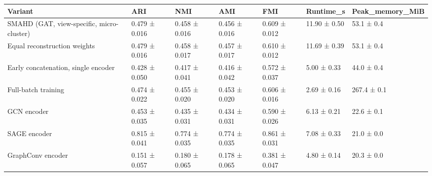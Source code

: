 \begin{tabular}{lllllll}
\toprule
Variant & ARI & NMI & AMI & FMI & Runtime\_s & Peak\_memory\_MiB \\
\midrule
SMAHD (GAT, view-specific, micro-cluster) & 0.479 ± 0.016 & 0.458 ± 0.016 & 0.456 ± 0.016 & 0.609 ± 0.012 & 11.90 ± 0.50 & 53.1 ± 0.4 \\
Equal reconstruction weights & 0.479 ± 0.016 & 0.458 ± 0.017 & 0.457 ± 0.017 & 0.610 ± 0.012 & 11.69 ± 0.39 & 53.1 ± 0.4 \\
Early concatenation, single encoder & 0.428 ± 0.050 & 0.417 ± 0.041 & 0.416 ± 0.042 & 0.572 ± 0.037 & 5.00 ± 0.33 & 44.0 ± 0.4 \\
Full-batch training & 0.474 ± 0.022 & 0.455 ± 0.020 & 0.453 ± 0.020 & 0.606 ± 0.016 & 2.69 ± 0.16 & 267.4 ± 0.1 \\
GCN encoder & 0.453 ± 0.035 & 0.435 ± 0.031 & 0.434 ± 0.031 & 0.590 ± 0.026 & 6.13 ± 0.21 & 22.6 ± 0.1 \\
SAGE encoder & 0.815 ± 0.041 & 0.774 ± 0.035 & 0.774 ± 0.035 & 0.861 ± 0.031 & 7.08 ± 0.33 & 21.0 ± 0.0 \\
GraphConv encoder & 0.151 ± 0.057 & 0.180 ± 0.065 & 0.178 ± 0.065 & 0.381 ± 0.047 & 4.80 ± 0.14 & 20.3 ± 0.0 \\
\bottomrule
\end{tabular}
